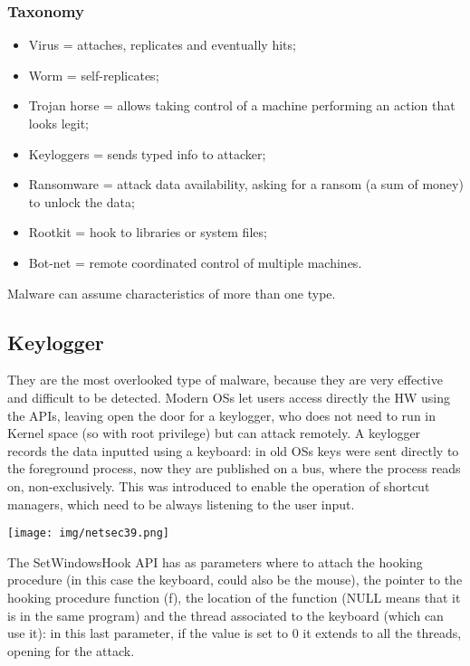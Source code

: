 \documentclass[a4paper, 10pt, titlepage]{article}
\begin{document}
\subsubsection*{Taxonomy}
\begin{itemize}
	\item Virus = attaches, replicates and eventually hits;
	\item Worm = self-replicates;
	\item Trojan horse = allows taking control of a machine performing an action that looks legit;
	\item Keyloggers = sends typed info to attacker;
	\item Ransomware = attack data availability, asking for a ransom (a sum of money) to unlock the data;
	\item Rootkit = hook to libraries or system files;
	\item Bot-net = remote coordinated control of multiple machines.
\end{itemize}
Malware can assume characteristics of more than one type.

\subsection{Keylogger}
They are the most overlooked type of malware, because they are very effective and difficult to be detected. Modern OSs let users access directly the HW using the APIs, leaving open the door for a keylogger, who does not need to run in Kernel space (so with root privilege) but can attack remotely. A keylogger records the data inputted using a keyboard: in old OSs keys were sent directly to the foreground process, now they are published on a bus, where the process reads on, non-exclusively. This was introduced to enable the operation of shortcut managers, which need to be always listening to the user input.
\begin{center}
	\texttt{[image: img/netsec39.png]}
\end{center}
The SetWindowsHook API has as parameters where to attach the hooking procedure (in this case the keyboard, could also be the mouse), the pointer to the hooking procedure function (f), the location of the function (NULL means that it is in the same program) and the thread associated to the keyboard (which can use it): in this last parameter, if the value is set to 0 it extends to all the threads, opening for the attack.

 
\end{document}
